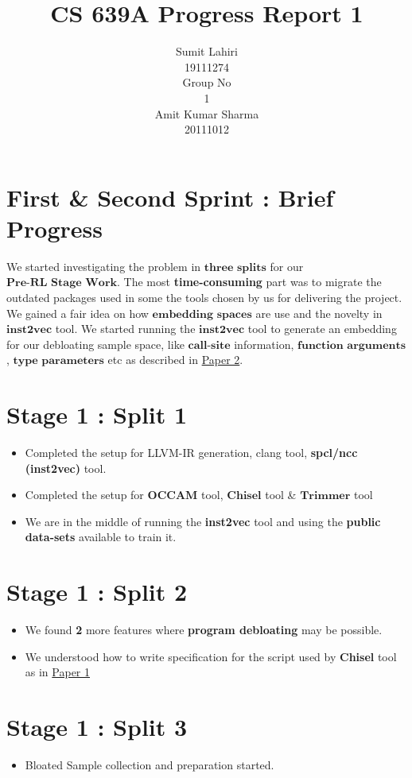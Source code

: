 \documentclass{article} %
\title{CS 639A Progress Report 1}
\author{
Sumit Lahiri \\
19111274 \\
\And
Group No\\
1\\
\And
Amit Kumar Sharma \\
20111012\\
}
\begin{document}
\maketitle

\section*{First \& Second Sprint : Brief Progress}
We started investigating the problem in $\textbf{three splits}$ for our $\textbf{Pre-RL Stage Work}$. The most \textbf{time-consuming} part was to migrate the outdated packages used in some the tools chosen by us for delivering the project. We gained a fair idea on how $\textbf{embedding spaces}$ are use and the novelty in $\textbf{inst2vec}$ tool. We started running the $\textbf{inst2vec}$ tool to generate an embedding for our debloating sample space, like $\textbf{call-site}$ information, $\textbf{function arguments}$, $\textbf{type parameters}$ etc as described in \href{http://www.csl.sri.com/users/gehani/papers/MLSys-2019.DeepOCCAM.pdf}{Paper 2}. 

\section*{Stage 1 : Split 1} 
\begin{itemize}
    \item Completed the setup for LLVM-IR generation, clang tool, \textbf{spcl/ncc (inst2vec)} tool. 
    \item Completed the setup for $\textbf{OCCAM}$ tool, $\textbf{Chisel}$ tool \& $\textbf{Trimmer}$ tool 
	\item We are in the middle of running the \textbf{inst2vec} tool and using the \textbf{public data-sets} available to train it. 
\end{itemize}

\section*{Stage 1 : Split 2}
\begin{itemize}
	\item We found \textbf{2} more features where \textbf{program debloating} may be possible. 
	\item We understood how to write specification for the script used by \textbf{Chisel} tool as in \href{https://dl.acm.org/doi/10.1145/3243734.3243838}{Paper 1}
\end{itemize}

\section*{Stage 1 : Split 3}
\begin{itemize}
	\item Bloated Sample collection and preparation started. 
\end{itemize}
\end{document}
